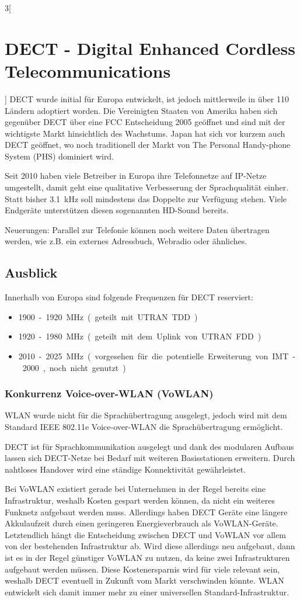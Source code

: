 \begin{multicols}{3}[\section{DECT - Digital Enhanced Cordless Telecommunications}]
DECT wurde initial für Europa entwickelt, ist jedoch mittlerweile in über 110 Ländern adoptiert worden. Die Vereinigten Staaten von Amerika haben sich gegenüber DECT über eine FCC Entscheidung 2005 geöffnet und sind mit der wichtigste Markt hinsichtlich des Wachstums. Japan hat sich vor kurzem auch DECT geöffnet, wo noch traditionell der Markt von The Personal Handy-phone System (PHS) dominiert wird.

Seit 2010 haben viele Betreiber in Europa ihre Telefonnetze auf IP-Netze umgestellt, damit geht eine qualitative Verbesserung der Sprachqualität einher. Statt bisher \SI{3.1}{\kilo\hertz} soll mindestens das Doppelte zur Verfügung stehen. Viele Endgeräte unterstützen  diesen sogenannten HD-Sound bereits.


Neuerungen:
Parallel zur Telefonie können noch weitere Daten übertragen werden, wie z.B. ein externes Adressbuch, Webradio oder ähnliches.
\cite{dect.3,dect.5}
\subsection*{Ausblick}
Innerhalb von Europa sind folgende Frequenzen für DECT reserviert:
\begin{itemize}
\item \SI{1900}-\SI{1920}{\mega\hertz} (geteilt mit UTRAN TDD)
\item \SI{1920}-\SI{1980}{\mega\hertz} (geteilt mit dem Uplink von UTRAN FDD)
\item \SI{2010}-\SI{2025}{\mega\hertz} (vorgesehen für die potentielle Erweiterung von IMT-2000, noch nicht genutzt)
\end{itemize} 

\subsubsection*{Konkurrenz Voice-over-WLAN (VoWLAN)}
WLAN wurde nicht für die Sprachübertragung ausgelegt, jedoch wird mit dem Standard IEEE 802.11e Voice-over-WLAN die Sprachübertragung ermöglicht.

DECT ist für Sprachkommunikation ausgelegt und dank des modularen Aufbaus lassen sich DECT-Netze bei Bedarf mit weiteren Basisstationen erweitern. Durch nahtloses Handover wird eine ständige Konnektivität gewährleistet.

Bei VoWLAN existiert gerade bei Unternehmen in der Regel bereits eine Infrastruktur, weshalb Kosten gespart werden können, da nicht ein weiteres Funknetz aufgebaut werden muss. Allerdings haben DECT Geräte eine längere Akkulaufzeit durch einen geringeren Energieverbrauch als VoWLAN-Geräte.
Letztendlich hängt die Entscheidung zwischen DECT und VoWLAN vor allem von der bestehenden Infrastruktur ab. Wird diese allerdings neu aufgebaut, dann ist es in der Regel günstiger VoWLAN zu nutzen, da keine zwei Infrastrukturen aufgebaut werden müssen. Diese Kostenersparnis wird für viele relevant sein, weshalb DECT eventuell in Zukunft vom Markt verschwinden könnte. WLAN entwickelt sich damit immer mehr zu einer universellen Standard-Infrastruktur. 


\end{multicols}
